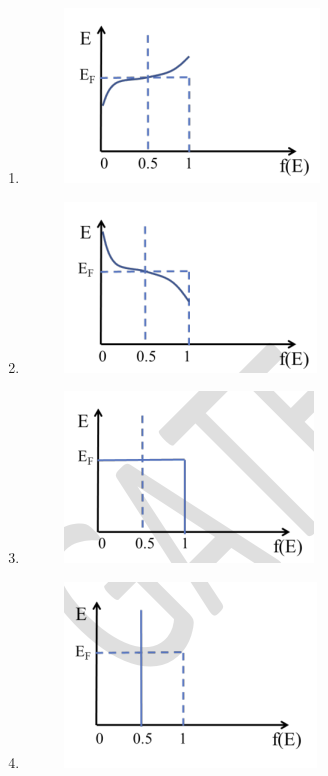 \documentclass[12pt]{article}
\begin{document}
\begin{enumerate}
\begin{enumerate}
\item \begin{figure}[H]
    \centering
    \includegraphics[width=0.5\columnwidth]{figs/ass5_c_q56_a.png}
    \caption{}
    \label{fig:placeholder}
\end{figure}
\item \begin{figure}[H]
    \centering
    \includegraphics[width=0.5\columnwidth]{figs/ass5_c_q56_b.png}
    \caption{}
    \label{fig:placeholder}
\end{figure}
\item \begin{figure}[H]
    \centering
    \includegraphics[width=0.5\columnwidth]{figs/ass5_c_q56_c.png}
    \caption{}
    \label{fig:placeholder}
\end{figure}
\item \begin{figure}[H]
    \centering
    \includegraphics[width=0.5\columnwidth]{figs/ass5_c_q56_d.png}
    \caption{}
    \label{fig:placeholder}
\end{figure}
\end{enumerate}


\end{enumerate}
\end{document}
